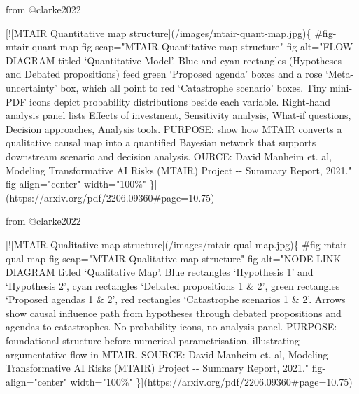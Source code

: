 \documentclass[
  11pt,
  letterpaper,
]{book}
\newenvironment{Shaded}{\begin{snugshade}}{\end{snugshade}}
\newcommand{\CommentTok}[1]{\textcolor[rgb]{0.37,0.37,0.37}{#1}}
\newcommand{\NormalTok}[1]{\textcolor[rgb]{0.00,0.23,0.31}{#1}}
\newcommand{\OtherTok}[1]{\textcolor[rgb]{0.00,0.23,0.31}{#1}}
\begin{document}
\begin{Shaded}
\begin{Highlighting}[]
\NormalTok{from @clarke2022}

\CommentTok{[}\OtherTok{![MTAIR Quantitative map structure}\CommentTok{](/images/mtair{-}quant{-}map.jpg)}\NormalTok{\{}
\NormalTok{    \#fig{-}mtair{-}quant{-}map}
\NormalTok{    fig{-}scap="MTAIR Quantitative map structure"}
\NormalTok{    fig{-}alt="FLOW DIAGRAM titled ‘Quantitative Model’. Blue and cyan rectangles (Hypotheses and Debated propositions) feed green ‘Proposed agenda’ boxes and a rose ‘Meta{-}uncertainty’ box, which all point to red ‘Catastrophe scenario’ boxes. Tiny mini{-}PDF icons depict probability distributions beside each variable. Right{-}hand analysis panel lists Effects of investment, Sensitivity analysis, What{-}if questions, Decision approaches, Analysis tools. PURPOSE: show how MTAIR converts a qualitative causal map into a quantified Bayesian network that supports downstream scenario and decision analysis. OURCE: David Manheim et. al, Modeling Transformative AI Risks (MTAIR) Project {-}{-} Summary Report, 2021."}
\NormalTok{    fig{-}align="center"}
\NormalTok{    width="100\%"}
\NormalTok{\}](https://arxiv.org/pdf/2206.09360\#page=10.75)}














\NormalTok{from @clarke2022}

\CommentTok{[}\OtherTok{![MTAIR Qualitative map structure}\CommentTok{](/images/mtair{-}qual{-}map.jpg)}\NormalTok{\{}
\NormalTok{    \#fig{-}mtair{-}qual{-}map}
\NormalTok{    fig{-}scap="MTAIR Qualitative map structure"}
\NormalTok{    fig{-}alt="NODE{-}LINK DIAGRAM titled ‘Qualitative Map’. Blue rectangles ‘Hypothesis 1’ and ‘Hypothesis 2’, cyan rectangles ‘Debated propositions 1 \& 2’, green rectangles ‘Proposed agendas 1 \& 2’, red rectangles ‘Catastrophe scenarios 1 \& 2’. Arrows show causal influence path from hypotheses through debated propositions and agendas to catastrophes. No probability icons, no analysis panel. PURPOSE: foundational structure before numerical parametrisation, illustrating argumentative flow in MTAIR. SOURCE: David Manheim et. al, Modeling Transformative AI Risks (MTAIR) Project {-}{-} Summary Report, 2021."}
\NormalTok{    fig{-}align="center"}
\NormalTok{    width="100\%"}
\NormalTok{\}](https://arxiv.org/pdf/2206.09360\#page=10.75)}







\end{Highlighting}
\end{Shaded}
\end{document}
